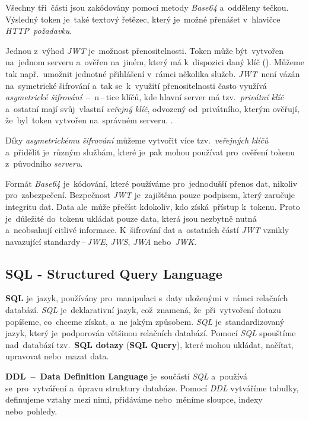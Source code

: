 \documentclass[11pt,a4paper]{report}
\begin{document}
                Všechny tři~části jsou zakódovány pomocí metody \emph{Base64} a~odděleny tečkou. Výsledný token je~také textový řetězec, který je~možné přenášet v~hlavičce \emph{HTTP~požadavku}.

                Jednou z~výhod \emph{JWT} je~možnost přenositelnosti. Token může být~vytvořen na~jednom serveru a~ověřen na~jiném, který má k~dispozici daný klíč (\cite{ieee:jwt}). Můžeme tak např.~umožnit jednotné přihlášení v~rámci několika služeb. \emph{JWT}~není vázán na~symetrické šifrování a~tak se~k~využití přenositelnosti často využívá \emph{asymetrické šifrování}~--~n\,--\,tice klíčů, kde hlavní server má tzv.~\emph{privátní klíč} a~ostatní mají svůj~vlastní \emph{veřejný klíč}, odvozený od~privátního, kterým ověřují, že~byl~token vytvořen na~správném serveru. \cite{miguelgrinbergJSONTokens}.
                
                Díky \emph{asymetrickému šifrování} můžeme vytvořit více tzv.~\emph{veřejných klíčů} a~přidělit je~různým službám, které je~pak mohou používat pro~ověření tokenu z~původního \emph{serveru}.

                Formát \emph{Base64} je~kódování, které používáme pro~jednodušší přenos dat, nikoliv pro~zabezpečení. Bezpečnost \emph{JWT} je~zajištěna pouze podpisem, který zaručuje integritu dat. Data ale~může přečíst kdokoliv, kdo získá~přístup k~tokenu. Proto je~důležité do~tokenu ukládat pouze data, která jsou nezbytně nutná a~neobsahují citlivé informace. K~šifrování dat a~ostatních částí \emph{JWT} vznikly navazující standardy\,--\,\emph{JWE}, \emph{JWS}, \emph{JWA} nebo~\emph{JWK}.~\cite{jwtesak, graham2021ethical}

            \subsection{SQL - Structured Query Language}
            \textbf{SQL} je~jazyk, používány pro~manipulaci s~daty uloženými v~rámci relačních databází. \emph{SQL} je~deklarativní jazyk, což~znamená, že~při~vytvoření dotazu popíšeme, co~chceme získat, a~ne jakým způsobem. \emph{SQL} je~standardizovaný jazyk, který je~podporován většinou relačních databází. Pomocí \emph{SQL} spouštíme nad~databází tzv.~\textbf{SQL dotazy} (\textbf{SQL Query}), které mohou ukládat, načítat, upravovat nebo~mazat data.

            \textbf{DDL~--~Data Definition Language} je~součástí \emph{SQL} a~používá se~pro~vytváření a~úpravu struktury databáze. Pomocí \emph{DDL} vytváříme tabulky, definujeme vztahy mezi nimi, přidáváme nebo~měníme sloupce, indexy nebo~pohledy. \cite{laurencik2018sql}
\end{document}
